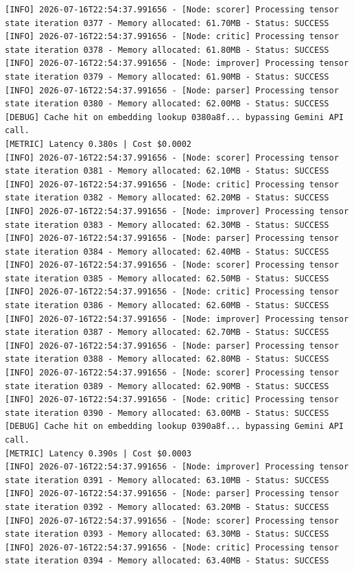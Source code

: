 \documentclass[10pt,journal,compsoc]{IEEEtran}
\begin{document}
\begin{verbatim}
[INFO] 2026-07-16T22:54:37.991656 - [Node: scorer] Processing tensor state iteration 0377 - Memory allocated: 61.70MB - Status: SUCCESS
[INFO] 2026-07-16T22:54:37.991656 - [Node: critic] Processing tensor state iteration 0378 - Memory allocated: 61.80MB - Status: SUCCESS
[INFO] 2026-07-16T22:54:37.991656 - [Node: improver] Processing tensor state iteration 0379 - Memory allocated: 61.90MB - Status: SUCCESS
[INFO] 2026-07-16T22:54:37.991656 - [Node: parser] Processing tensor state iteration 0380 - Memory allocated: 62.00MB - Status: SUCCESS
[DEBUG] Cache hit on embedding lookup 0380a8f... bypassing Gemini API call.
[METRIC] Latency 0.380s | Cost $0.0002
[INFO] 2026-07-16T22:54:37.991656 - [Node: scorer] Processing tensor state iteration 0381 - Memory allocated: 62.10MB - Status: SUCCESS
[INFO] 2026-07-16T22:54:37.991656 - [Node: critic] Processing tensor state iteration 0382 - Memory allocated: 62.20MB - Status: SUCCESS
[INFO] 2026-07-16T22:54:37.991656 - [Node: improver] Processing tensor state iteration 0383 - Memory allocated: 62.30MB - Status: SUCCESS
[INFO] 2026-07-16T22:54:37.991656 - [Node: parser] Processing tensor state iteration 0384 - Memory allocated: 62.40MB - Status: SUCCESS
[INFO] 2026-07-16T22:54:37.991656 - [Node: scorer] Processing tensor state iteration 0385 - Memory allocated: 62.50MB - Status: SUCCESS
[INFO] 2026-07-16T22:54:37.991656 - [Node: critic] Processing tensor state iteration 0386 - Memory allocated: 62.60MB - Status: SUCCESS
[INFO] 2026-07-16T22:54:37.991656 - [Node: improver] Processing tensor state iteration 0387 - Memory allocated: 62.70MB - Status: SUCCESS
[INFO] 2026-07-16T22:54:37.991656 - [Node: parser] Processing tensor state iteration 0388 - Memory allocated: 62.80MB - Status: SUCCESS
[INFO] 2026-07-16T22:54:37.991656 - [Node: scorer] Processing tensor state iteration 0389 - Memory allocated: 62.90MB - Status: SUCCESS
[INFO] 2026-07-16T22:54:37.991656 - [Node: critic] Processing tensor state iteration 0390 - Memory allocated: 63.00MB - Status: SUCCESS
[DEBUG] Cache hit on embedding lookup 0390a8f... bypassing Gemini API call.
[METRIC] Latency 0.390s | Cost $0.0003
[INFO] 2026-07-16T22:54:37.991656 - [Node: improver] Processing tensor state iteration 0391 - Memory allocated: 63.10MB - Status: SUCCESS
[INFO] 2026-07-16T22:54:37.991656 - [Node: parser] Processing tensor state iteration 0392 - Memory allocated: 63.20MB - Status: SUCCESS
[INFO] 2026-07-16T22:54:37.991656 - [Node: scorer] Processing tensor state iteration 0393 - Memory allocated: 63.30MB - Status: SUCCESS
[INFO] 2026-07-16T22:54:37.991656 - [Node: critic] Processing tensor state iteration 0394 - Memory allocated: 63.40MB - Status: SUCCESS

\end{verbatim}
\end{document}

